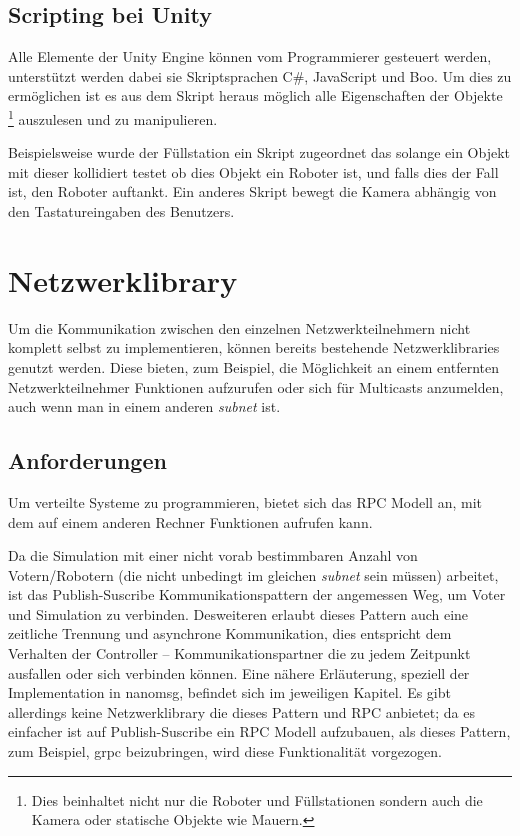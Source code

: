 \documentclass[
    12pt,
    bibliography=totoc,
    ngerman,
	enabledeprecatedfontcommands
]{scrartcl}
\begin{document}
\subsection{Scripting bei Unity}
Alle Elemente der Unity Engine k{\"{o}}nnen vom Programmierer gesteuert werden, unterst{\"{u}}tzt werden dabei sie Skriptsprachen C\#, JavaScript und Boo.\cite{wiki:unity} Um dies zu erm{\"{o}}glichen ist es aus dem Skript heraus m{\"{o}}glich alle Eigenschaften
der Objekte \footnote{Dies beinhaltet nicht nur die Roboter und F{\"{u}}llstationen sondern auch die Kamera oder statische Objekte wie Mauern.} auszulesen und zu manipulieren.

Beispielsweise wurde der F{\"{u}}llstation ein Skript zugeordnet das solange ein Objekt mit dieser kollidiert testet ob dies Objekt ein Roboter ist, und falls dies der Fall ist,
den Roboter auftankt. Ein anderes Skript bewegt die Kamera abh{\"{a}}ngig von den Tastatureingaben des Benutzers.

\clearpage
\section{Netzwerklibrary}
Um die Kommunikation zwischen den einzelnen Netzwerkteilnehmern nicht komplett selbst zu implementieren, k{\"{o}}nnen bereits bestehende Netzwerklibraries genutzt werden.
Diese bieten, zum Beispiel, die M{\"{o}}glichkeit an einem entfernten Netzwerkteilnehmer Funktionen aufzurufen oder sich f{\"{u}}r Multicasts anzumelden, auch wenn man in einem anderen
\textit{subnet} ist.

\subsection{Anforderungen}
Um verteilte Systeme zu programmieren, bietet sich das RPC Modell an, mit dem auf einem anderen Rechner Funktionen aufrufen kann.

Da die Simulation mit einer nicht vorab bestimmbaren Anzahl von Votern/Robotern (die nicht unbedingt im gleichen \textit{subnet} sein m{\"{u}}ssen) arbeitet, ist das Publish-Suscribe Kommunikationspattern\cite{pubsub}
der angemessen Weg, um Voter und Simulation zu verbinden.
Desweiteren erlaubt dieses Pattern auch eine zeitliche Trennung und asynchrone Kommunikation, dies entspricht dem Verhalten der Controller -- Kommunikationspartner die zu jedem Zeitpunkt ausfallen oder
sich verbinden k{\"{o}}nnen. Eine n{\"{a}}here Erl{\"{a}}uterung, speziell der Implementation in nanomsg, befindet sich im jeweiligen Kapitel.
Es gibt allerdings keine Netzwerklibrary die dieses Pattern und RPC anbietet; da es einfacher ist auf Publish-Suscribe ein RPC Modell aufzubauen, als dieses Pattern, zum Beispiel, grpc beizubringen, wird
diese Funktionalit{\"{a}}t vorgezogen.
\end{document}

